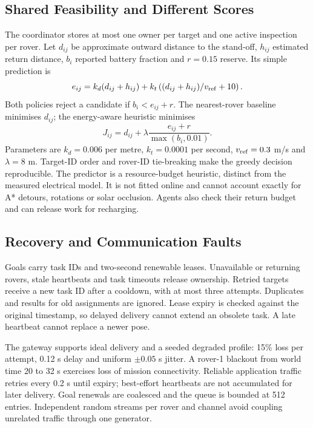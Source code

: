 \documentclass[conference]{IEEEtran}
\begin{document}
\subsection{Shared Feasibility and Different Scores}
The coordinator stores at most one owner per target and one active inspection
per rover. Let $d_{ij}$ be approximate outward distance to the stand-off,
$h_{ij}$ estimated return distance, $b_i$ reported battery fraction and
$r=0.15$ reserve. Its simple prediction is
\begin{equation}
e_{ij}=k_d(d_{ij}+h_{ij})+
k_t\left((d_{ij}+h_{ij})/v_{\rm ref}+10\right).
\end{equation}
Both policies reject a candidate if $b_i<e_{ij}+r$. The nearest-rover baseline
minimises $d_{ij}$; the energy-aware heuristic minimises
\begin{equation}
J_{ij}=d_{ij}+\lambda\frac{e_{ij}+r}{\max(b_i,0.01)}.
\end{equation}
Parameters are $k_d=0.006$ per metre, $k_t=0.0001$ per second,
$v_{\rm ref}=0.3$ m/s and $\lambda=8$ m. Target-ID order and rover-ID tie-breaking
make the greedy decision reproducible. The predictor is a resource-budget
heuristic, distinct from the measured electrical model. It is not fitted online
and cannot account exactly for A* detours, rotations or solar occlusion.
Agents also check their return budget and can release work for recharging.

\subsection{Recovery and Communication Faults}
Goals carry task IDs and two-second renewable leases. Unavailable or returning
rovers, stale heartbeats and task timeouts release ownership. Retried targets
receive a new task ID after a cooldown, with at most three attempts.
Duplicates and results for old assignments are ignored. Lease expiry is checked
against the original timestamp, so delayed delivery cannot extend an obsolete
task. A late heartbeat cannot replace a newer pose.

The gateway supports ideal delivery and a seeded degraded profile: 15\% loss
per attempt, 0.12 s delay and uniform $\pm0.05$ s jitter. A rover-1 blackout from
world time 20 to 32 s exercises loss of mission connectivity. Reliable
application traffic retries every 0.2 s until expiry; best-effort heartbeats are
not accumulated for later delivery. Goal renewals are coalesced and the queue
is bounded at 512 entries. Independent random streams per rover and channel
avoid coupling unrelated traffic through one generator.
\end{document}

